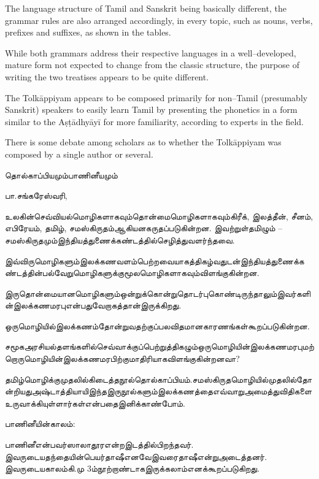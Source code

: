 \item The language structure of Tamil and Sanskrit being basically different, the grammar rules are also arranged accordingly, in every topic, such as nouns, verbs, prefixes and suffixes, as shown in the tables. 

 \item While both grammars address their respective languages in a well–developed, mature form not expected to change from the classic structure, the purpose of writing the two treatises appears to be quite different. 

 \item The Tolkāppiyam appears to be composed primarily for non–Tamil (presumably Sanskrit) speakers to easily learn Tamil by presenting the phonetics in a form similar to the Aṣṭādhyāyī for more familiarity, according to experts in the field.

 \item There is some debate among scholars as to whether the Tolkāppiyam was composed by a single author or several.



தொல்காப்பியமும்பாணினீயமும்

பா.சங்கரேஸ்வரி,

உலகின்செவ்வியல்மொழிகளாகவும்தொன்மைமொழிகளாகவும்கிரீக், இலத்தீன், சீனம், எபிரேயம், தமிழ், சமஸ்கிருதம்ஆகியனகருதப்படுகின்றன. இவற்றுள்தமிழும் – சமஸ்கிருதமும்இந்தியத்துணைக்கண்டத்தில்செழித்துவளர்ந்தவை.

இவ்விருமொழிகளும்இலக்கணவளம்பெற்றவையாகத்திகழ்வதுடன்இந்தியத்துணைக்கண்டத்தின்பல்வேறுமொழிகளுக்குமூலமொழிகளாகவும்விளங்குகின்றன. 

இருதொன்மையானமொழிகளும்ஒன்றுக்கொன்றுதொடர்புகொண்டிருந்தாலும்இவர்களின்இலக்கணமரபுஎன்பதுவேறாகத்தான்இருக்கிறது. 

ஒருமொழியில்இலக்கணம்தோன்றுவதற்குப்பலவிதமானகாரணங்கள்கூறப்படுகின்றன. 

சமூகஅரசியல்தளங்களில்செவ்வாக்குப்பெற்றுத்திகழும்ஒருமொழியின்இலக்கணமரபுமற்றொருமொழியின்இலக்கணமரபிற்குமாதிரியாகவிளங்குகின்றனவா? 

தமிழ்மொழிக்குமுதலில்கிடைத்தநூல்தொல்காப்பியம்.சமஸ்கிருதமொழியில்முதலில்தோன்றியதுஅஷ்டாத்தியாயிஇந்தஇருநூல்களும்இலக்கணத்தைஎவ்வாறுஅமைத்துவிதிகளைஉருவாக்கியுள்ளார்கள்என்பதைஇனிக்காண்போம்.

பாணினீயின்காலம்:

பாணினீஎன்பவர்ஸாலாதூரஎன்றஇடத்தில்பிறந்தவர். இவருடையதந்தையின்பெயர்தாஷீஎனவேஇவரைதாஷீஎன்றுஅடைத்தனர். இவருடையகாலம்கி.மு 3ம்நூற்றாண்டாகஇருக்கலாம்எனக்கூறப்படுகிறது.

